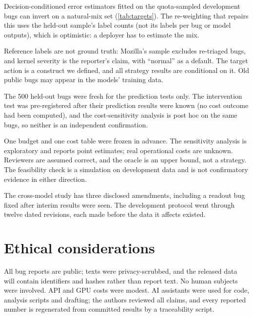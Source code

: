  Decision-conditioned error estimators fitted on
the quota-sampled development bugs can invert on a natural-mix set
(\cref{tab:targets}). The re-weighting that repairs this uses the
held-out sample's label counts (not its labels per bug or model outputs),
which is optimistic: a deployer has to estimate the mix.

 Reference labels are not ground truth: Mozilla's
sample excludes re-triaged bugs, and kernel severity is the reporter's
claim, with ``normal'' as a default. The target action is a construct we
defined, and all strategy results are conditional on it. Old public bugs
may appear in the models' training data.

 The 500 held-out bugs were fresh for the
prediction tests only. The intervention test was pre-registered after
their prediction results were known (no cost outcome had been computed),
and the cost-sensitivity analysis is post hoc on the same bugs, so neither
is an independent confirmation.

 One budget and one cost table were frozen in
advance. The sensitivity analysis is exploratory and reports point
estimates; real operational costs are unknown. Reviewers are assumed
correct, and the oracle is an upper bound, not a strategy. The feasibility
check is a simulation on development data and is not confirmatory evidence
in either direction.

 The cross-model study has three disclosed amendments,
including a readout bug fixed after interim results were seen. The
development protocol went through twelve dated revisions, each made
before the data it affects existed.

\section*{Ethical considerations}

All bug reports are public; texts were privacy-scrubbed, and the released
data will contain identifiers and hashes rather than report text. No
human subjects were involved. API and GPU costs were modest. AI
assistants were used for code, analysis scripts and drafting; the authors
reviewed all claims, and every reported number is regenerated from
committed results by a traceability script.
